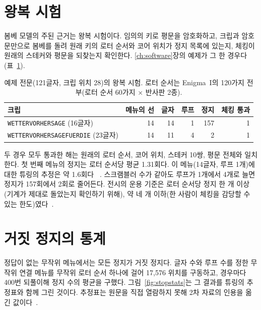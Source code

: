 \section{왕복 시험}

봄베 모델의 주된 근거는 왕복 시험이다. 임의의 키로 평문을 암호화하고, 크립과 암호문만으로 봄베를 돌려
원래 키의 로터 순서와 코어 위치가 정지 목록에 있는지, 체킹이 원래의 스테커와 평문을 되찾는지 확인한다.
\ref{ch:software}장의 예제가 그 한 경우다(표~\ref{tab:roundtrip}).

\begin{table}[ht]
\centering
\caption{예제 전문(121글자, 크립 위치 28)의 왕복 시험. 로터 순서는 Enigma~I의 120가지 전부(로터 순서 60가지 × 반사판 2종).}
\label{tab:roundtrip}
\begin{tabular}{lrrrrr}
\toprule
크립 & 메뉴의 선 & 글자 & 루프 & 정지 & 체킹 통과 \\
\midrule
\texttt{WETTERVORHERSAGE} (16글자) & 14 & 14 & 1 & 157 & 1 \\
\texttt{WETTERVORHERSAGEFUERDIE} (23글자) & 14 & 11 & 4 & 2 & 1 \\
\bottomrule
\end{tabular}
\end{table}

두 경우 모두 통과한 해는 원래의 로터 순서, 코어 위치, 스테커 10쌍, 평문 전체와 일치한다. 첫 번째 메뉴의
정지는 로터 순서당 평균 1.31회다. 이 메뉴(14글자, 루프 1개)에 대한 튜링의 추정은 약 1.6회다%
~\cite{carter-stops,wikipedia-bombe}. 스크램블러 수가 같아도 루프가 1개에서 4개로 늘면 정지가 157회에서
2회로 줄어든다. 전시의 운용 기준은 로터 순서당 정지 한 개 이상(기계가 제대로 돌았는지 확인하기 위해),
약 네 개 이하(한 사람이 체킹을 감당할 수 있는 한도)였다~\cite[31, 44, 49]{us6812report1944}.

\section{거짓 정지의 통계}\label{sec:stopstats}

정답이 없는 무작위 메뉴에서는 모든 정지가 거짓 정지다. 글자 수와 루프 수를 정한 무작위 연결 메뉴를
무작위 로터 순서 하나에 걸어 17,576 위치를 구동하고, 경우마다 400번 되풀이해 정지 수의 평균을 구했다.
그림~\ref{fig:stopstats}는 그 결과를 튜링의 추정표와 함께 그린 것이다. 추정표는 원문을 직접 열람하지
못해 2차 자료의 인용을 옮긴 값이다~\cite{carter-stops,wikipedia-bombe}.

